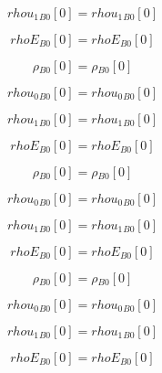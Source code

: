 \documentclass{article}
\begin{document}
\begin{dmath}{rhou_{1}{_{B0}}}[{0}] = {rhou_{1}{_{B0}}}[{0}]\end{dmath}

\begin{dmath}{rhoE{_{B0}}}[{0}] = {rhoE{_{B0}}}[{0}]\end{dmath}

\begin{dmath}{\rho{_{B0}}}[{0}] = {\rho{_{B0}}}[{0}]\end{dmath}

\begin{dmath}{rhou_{0}{_{B0}}}[{0}] = {rhou_{0}{_{B0}}}[{0}]\end{dmath}

\begin{dmath}{rhou_{1}{_{B0}}}[{0}] = {rhou_{1}{_{B0}}}[{0}]\end{dmath}

\begin{dmath}{rhoE{_{B0}}}[{0}] = {rhoE{_{B0}}}[{0}]\end{dmath}

\begin{dmath}{\rho{_{B0}}}[{0}] = {\rho{_{B0}}}[{0}]\end{dmath}

\begin{dmath}{rhou_{0}{_{B0}}}[{0}] = {rhou_{0}{_{B0}}}[{0}]\end{dmath}

\begin{dmath}{rhou_{1}{_{B0}}}[{0}] = {rhou_{1}{_{B0}}}[{0}]\end{dmath}

\begin{dmath}{rhoE{_{B0}}}[{0}] = {rhoE{_{B0}}}[{0}]\end{dmath}

\begin{dmath}{\rho{_{B0}}}[{0}] = {\rho{_{B0}}}[{0}]\end{dmath}

\begin{dmath}{rhou_{0}{_{B0}}}[{0}] = {rhou_{0}{_{B0}}}[{0}]\end{dmath}

\begin{dmath}{rhou_{1}{_{B0}}}[{0}] = {rhou_{1}{_{B0}}}[{0}]\end{dmath}

\begin{dmath}{rhoE{_{B0}}}[{0}] = {rhoE{_{B0}}}[{0}]\end{dmath}
\end{document}

